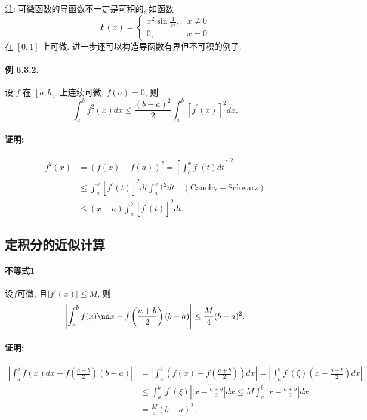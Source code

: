 注: 可微函数的导函数不一定是可积的, 如函数 
\[
F(x)=\begin{cases}
x^{2}\sin\frac{1}{x^{2}}, & x\neq0\\
0, & x=0
\end{cases}
\]
在 $[0,1]$ 上可微. 进一步还可以构造导函数有界但不可积的例子.

\paragraph{例 6.3.2. }

设 $f$ 在 $[a,b]$ 上连续可微, $f(a)=0$, 则 
\[
\int_{a}^{b}f^{2}(x)dx\leqslant\frac{(b-a)^{2}}{2}\int_{a}^{b}\left[f^{\prime}(x)\right]^{2}dx.
\]


\paragraph{证明:}

\[
\begin{aligned}f^{2}(x) & =(f(x)-f(a))^{2}=\left[\int_{a}^{x}f^{\prime}(t)dt\right]^{2}\\
 & \leqslant\int_{a}^{x}\left[f^{\prime}(t)\right]^{2}dt\int_{a}^{x}1^{2}dt\quad(\text{Cauchy}-\text{Schwarz})\\
 & \leqslant(x-a)\int_{a}^{b}\left[f^{\prime}(t)\right]^{2}dt.
\end{aligned}
\]


\subsection{定积分的近似计算}

\paragraph{不等式1}

设$f$可微, 且$\left|f'(x)\right|\le M$, 则
\[
\left|\int_{a}^{b}f(x)\ud x-f\left(\frac{a+b}{2}\right)(b-a)\right|\le\frac{M}{4}(b-a)^{2}.
\]


\paragraph{证明:}

\[
\begin{aligned}\left|\int_{a}^{b}f(x)dx-f\left(\frac{a+b}{2}\right)(b-a)\right| & =\left|\int_{a}^{b}\left(f(x)-f\left(\frac{a+b}{2}\right)\right)dx\right|=\left|\int_{a}^{b}f^{\prime}(\xi)\left(x-\frac{a+b}{2}\right)dx\right|\\
 & \leqslant\int_{a}^{b}\left|f^{\prime}(\xi)\right|\left|x-\frac{a+b}{2}\right|dx\leqslant M\int_{a}^{b}\left|x-\frac{a+b}{2}\right|dx\\
 & =\frac{M}{4}(b-a)^{2}.
\end{aligned}
\]


